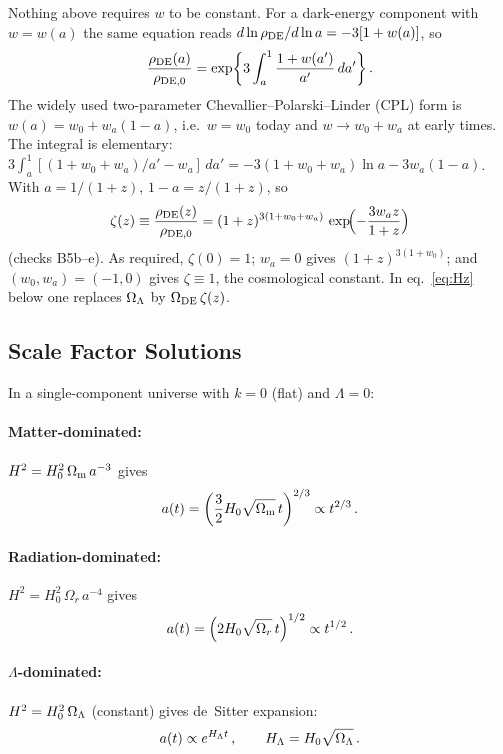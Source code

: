 \begin{annotation}
Nothing above requires $w$ to be constant.  For a dark-energy component with
$w = w(a)$ the same equation reads $d\ln\rho_{\rm DE}/d\ln a = -3[1+w(a)]$, so
\[
  \frac{\rho_{\rm DE}(a)}{\rho_{\rm DE,0}}
  = \exp\!\left\{3\int_a^1 \frac{1 + w(a')}{a'}\,da'\right\}.
\]
The widely used two-parameter Chevallier--Polarski--Linder (CPL) form \citep{chevallier_polarski_2001,linder_2003} is
$w(a) = w_0 + w_a(1-a)$, i.e.\ $w = w_0$ today and $w \to w_0 + w_a$ at early
times.  The integral is elementary:
$3\int_a^1 [(1+w_0+w_a)/a' - w_a]\,da' = -3(1+w_0+w_a)\ln a - 3w_a(1-a)$.
With $a = 1/(1+z)$, $1 - a = z/(1+z)$, so
\[
  \zeta(z) \equiv \frac{\rho_{\rm DE}(z)}{\rho_{\rm DE,0}}
  = (1+z)^{3(1+w_0+w_a)}\,\exp\!\Bigl(-\frac{3w_a z}{1+z}\Bigr)
\]
(checks B5b--e).  As required, $\zeta(0) = 1$; $w_a = 0$ gives
$(1+z)^{3(1+w_0)}$; and $(w_0,w_a) = (-1,0)$ gives $\zeta \equiv 1$, the cosmological
constant.  In eq.~\eqref{eq:Hz} below one replaces $\Omega_{\Lambda}$ by
$\Omega_{\rm DE}\,\zeta(z)$.
\end{annotation}
\subsection{Scale Factor Solutions}

In a single-component universe with $k = 0$ (flat) and $\Lambda = 0$:

\paragraph{Matter-dominated:}
$H^2 = H_0^2\, \Omega_{\mathrm{m}}\, a^{-3}$ gives
\begin{equation}
    a(t) = \left(\frac{3}{2}H_0\sqrt{\Omega_{\mathrm{m}}}\, t\right)^{2/3}
    \propto t^{2/3} \,.
    \label{eq:a_matter}
\end{equation}

\paragraph{Radiation-dominated:}
$H^2 = H_0^2\, \Omega_r\, a^{-4}$ gives
\begin{equation}
    a(t) = \left(2H_0\sqrt{\Omega_r}\, t\right)^{1/2}
    \propto t^{1/2} \,.
    \label{eq:a_radiation}
\end{equation}

\paragraph{$\Lambda$-dominated:}
$H^2 = H_0^2\, \Omega_{\Lambda}$ (constant) gives de~Sitter expansion:
\begin{equation}
    a(t) \propto e^{H_\Lambda t} \,,
    \qquad H_\Lambda = H_0\sqrt{\Omega_{\Lambda}} \,.
    \label{eq:a_lambda}
\end{equation}


